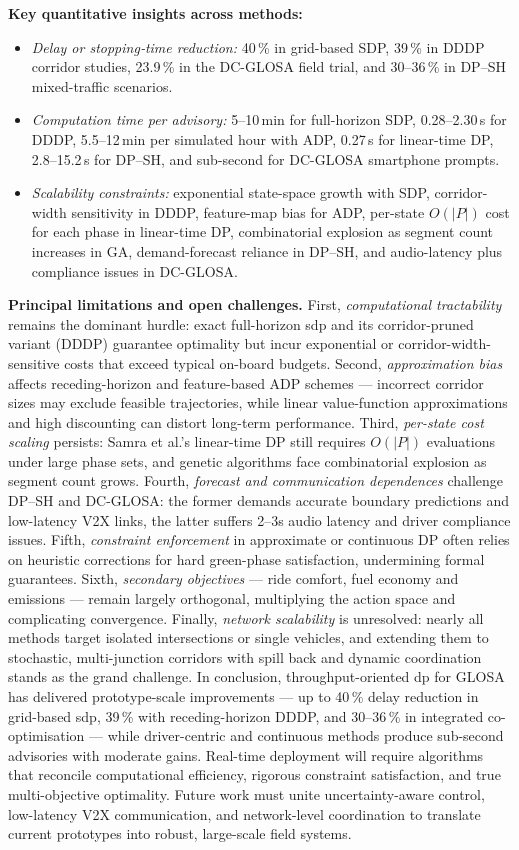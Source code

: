 \mynewline
\textbf{Key quantitative insights across methods:}
\begin{itemize}
  \item \emph{Delay or stopping‐time reduction:} 40\,\% in grid-based SDP, 39\,\% in DDDP corridor studies, 23.9\,\% in the DC-GLOSA field trial, and 30–36\,\% in DP–SH mixed-traffic scenarios.
  \item \emph{Computation time per advisory:} 5–10\,min for full-horizon SDP, 0.28–2.30\,s for DDDP, 5.5–12\,min per simulated hour with ADP, 0.27\,s for linear-time DP, 2.8–15.2\,s for DP–SH, and sub-second for DC-GLOSA smartphone prompts.
  \item \emph{Scalability constraints:} exponential state-space growth with SDP, corridor-width sensitivity in DDDP, feature-map bias for ADP, per-state $O(|P|)$ cost for each phase in linear-time DP, combinatorial explosion as segment count increases in GA, demand-forecast reliance in DP–SH, and audio-latency plus compliance issues in DC-GLOSA.
\end{itemize}

\textbf{Principal limitations and open challenges.} First, \emph{computational tractability} remains the dominant hurdle: exact full-horizon \ac{sdp} and its corridor-pruned variant (DDDP) guarantee optimality but incur exponential or corridor-width-sensitive costs that exceed typical on-board budgets. Second, \emph{approximation bias} affects receding-horizon and feature-based ADP schemes --- incorrect corridor sizes may exclude feasible trajectories, while linear value‐function approximations and high discounting can distort long-term performance. Third, \emph{per-state cost scaling} persists: Samra et al.’s linear-time DP still requires $O(|P|)$ evaluations under large phase sets, and genetic algorithms face combinatorial explosion as segment count grows. Fourth, \emph{forecast and communication dependences} challenge DP–SH and DC-GLOSA: the former demands accurate boundary predictions and low-latency V2X links, the latter suffers 2–3s audio latency and driver compliance issues. Fifth, \emph{constraint enforcement} in approximate or continuous DP often relies on heuristic corrections for hard green-phase satisfaction, undermining formal guarantees. Sixth, \emph{secondary objectives} --- ride comfort, fuel economy and emissions --- remain largely orthogonal, multiplying the action space and complicating convergence. Finally, \emph{network scalability} is unresolved: nearly all methods target isolated intersections or single vehicles, and extending them to stochastic, multi-junction corridors with spill back and dynamic coordination stands as the grand challenge.
\mynewline
In conclusion, throughput-oriented \ac{dp} for GLOSA has delivered prototype-scale improvements --- up to 40\,\% delay reduction in grid-based \ac{sdp}, 39\,\% with receding-horizon DDDP, and 30–36\,\% in integrated co-optimisation --- while driver-centric and continuous methods produce sub-second advisories with moderate gains. Real-time deployment will require algorithms that reconcile computational efficiency, rigorous constraint satisfaction, and true multi-objective optimality. Future work must unite uncertainty-aware control, low-latency V2X communication, and network-level coordination to translate current prototypes into robust, large-scale field systems.
